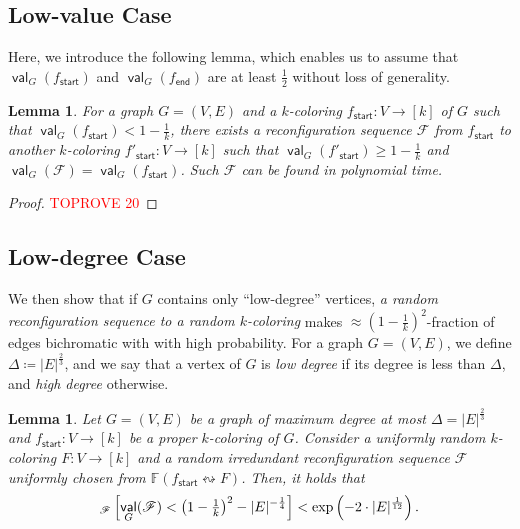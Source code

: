 \documentclass[11pt,fleqn]{article}
\renewcommand{\geq}{\geqslant}
\newcommand{\reco}{\leftrightsquigarrow}
\newcommand{\defeq}{\coloneq}
\DeclareMathOperator{\val}{\mathsf{val}}
\newcommand{\sss}{\mathsf{start}}
\newcommand{\ttt}{\mathsf{end}}
\newcommand{\f}{f}
\newcommand{\frnd}{F}
\newcommand{\sqcol}{\scrF}
\newcommand{\stsqcol}{\bbF}
\newcommand{\bbF}{\mathbb{F}}
\newcommand{\scrF}{\mathscr{F}}
\let\Pr\relax\DeclareMathOperator*{\Pr}{\mathbb{P}}
\newtheorem{lemma}[theorem]{Lemma}
\theoremstyle{definition}
\numberwithin{equation}{section}
\begin{document}
\subsection{Low-value Case}
\label{subsec:Cut-alg:low-value}
Here, we introduce the following lemma, which enables us to assume that
$\val_G(\f_\sss)$ and $\val_G(\f_\ttt)$ are at least $\frac{1}{2}$ without loss of generality.


\begin{lemma}
\label{lem:Cut-alg:low-value}
For a graph $G=(V,E)$ and
a $k$-coloring $\f_\sss \colon V \to [k]$ of $G$ such that
$\val_G(\f_\sss) < 1 - \frac{1}{k}$,
there exists a reconfiguration sequence $\sqcol$
from $\f_\sss$ to another $k$-coloring $\f'_\sss \colon V \to [k]$ such that
$\val_G(\f'_\sss) \geq 1-\frac{1}{k}$ and $\val_G(\sqcol) = \val_G(\f_\sss)$.
Such $\sqcol$ can be found in polynomial time.
\end{lemma}
\begin{proof}\textcolor{red}{TOPROVE 20}\end{proof}


\subsection{Low-degree Case}
\label{subsec:Cut-alg:low-degree}


We then show that
if $G$ contains only ``low-degree'' vertices,
\emph{a random reconfiguration sequence to a random $k$-coloring}
makes $\approx \left(1-\frac{1}{k}\right)^2$-fraction of edges bichromatic with
with high probability.
For a graph $G = (V,E)$,
we define $\Delta \defeq |E|^{\frac{2}{3}}$, and
we say that
a vertex of $G$ is \emph{low degree} if its degree is less than $\Delta$, and
\emph{high degree} otherwise.


\begin{lemma}
\label{lem:Cut-alg:low-degree}
Let $G=(V,E)$ be a graph of maximum degree at most $\Delta = |E|^{\frac{2}{3}}$ and
$\f_\sss \colon V \to [k]$ be a proper $k$-coloring of $G$.
Consider a uniformly random $k$-coloring $\frnd \colon V \to[k]$ and
a random irredundant reconfiguration sequence $\sqcol$
uniformly chosen from $\stsqcol(\f_\sss \reco \frnd)$.
Then, it holds that
\begin{align}
    \Pr_{\sqcol}\left[
        \val_G(\sqcol) < \left(1-\tfrac{1}{k}\right)^2 - |E|^{-\frac{1}{4}}
    \right]
    < \exp\left(-2 \cdot |E|^\frac{1}{12}\right).
\end{align}
\end{lemma}
\end{document}
